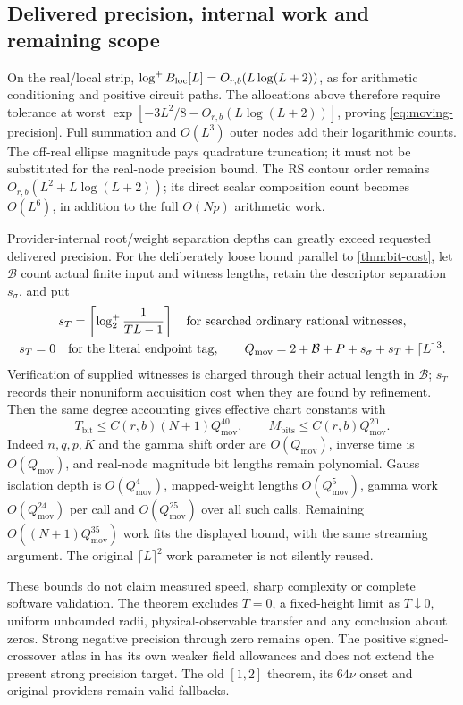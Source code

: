 \subsection{Delivered precision, internal work and remaining scope}
\label{subsec:moving-cost}
On the real/local strip,
\(\log^{+} B_{\mathrm{loc}}[L]=O_{r,b}(L\log(L+2))\), as for arithmetic
conditioning and positive circuit paths. The allocations above therefore
require tolerance at worst
\(\exp[-3L^2/8-O_{r,b}(L\log(L+2))]\), proving
\eqref{eq:moving-precision}. Full summation and \(O(L^3)\) outer nodes
add their logarithmic counts. The off-real ellipse magnitude pays
quadrature truncation; it must not be substituted for the real-node
precision bound. The RS contour order remains
\(O_{r,b}(L^2+L\log(L+2))\); its direct scalar composition count becomes
\(O(L^6)\), in addition to the full \(O(Np)\) arithmetic work.

Provider-internal root/weight separation depths can greatly exceed
requested delivered precision. For the deliberately loose bound parallel
to \cref{thm:bit-cost}, let \(\mathcal B\) count actual finite input and
witness lengths, retain the descriptor separation \(s_\sigma\), and put
\begin{equation}
 \begin{gathered}
 s_T=\left\lceil\log_2^+\frac1{TL-1}\right\rceil
       \quad\hbox{for searched ordinary rational witnesses},\\
 s_T=0\quad\hbox{for the literal endpoint tag},\qquad
 Q_{\mathrm{mov}}=2+\mathcal B+P+s_\sigma+s_T+\lceil L\rceil^3.
 \end{gathered}
 \label{eq:moving-work-parameter}
\end{equation}
Verification of supplied witnesses is charged through their actual
length in \(\mathcal B\); \(s_T\) records their nonuniform acquisition
cost when they are found by refinement. Then the same degree accounting
gives effective chart constants with
\begin{equation}
 T_{\mathrm{bit}}\le C(r,b)(N+1)Q_{\mathrm{mov}}^{40},\qquad
 M_{\mathrm{bits}}\le C(r,b)Q_{\mathrm{mov}}^{20}.
 \label{eq:moving-work}
\end{equation}
Indeed \(n,q,p,K\) and the gamma shift order are \(O(Q_{\mathrm{mov}})\),
inverse time is \(O(Q_{\mathrm{mov}})\), and real-node magnitude bit
lengths remain polynomial. Gauss isolation depth is
\(O(Q_{\mathrm{mov}}^4)\), mapped-weight lengths
\(O(Q_{\mathrm{mov}}^5)\), gamma work
\(O(Q_{\mathrm{mov}}^{24})\) per call and
\(O(Q_{\mathrm{mov}}^{25})\) over all such calls. Remaining
\(O((N+1)Q_{\mathrm{mov}}^{35})\) work fits the displayed bound, with
the same streaming argument. The original \(\lceil L\rceil^2\) work
parameter is not silently reused.

These bounds do not claim measured speed, sharp complexity or complete
software validation. The theorem excludes \(T=0\), a fixed-height limit
as \(T\downarrow0\), uniform unbounded radii, physical-observable
transfer and any conclusion about zeros. Strong negative precision
through zero remains open. The positive signed-crossover atlas in
\cite{ansatzcomp} has its own weaker field allowances and does not
extend the present strong precision target. The old \([1,2]\) theorem,
its \(64\nu\) onset and original providers remain valid fallbacks.
